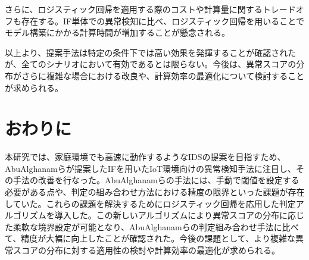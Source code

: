 \documentclass{css}
\begin{document}
さらに、ロジスティック回帰を適用する際のコストや計算量に関するトレードオフも存在する。IF単体での異常検知に比べ、ロジスティック回帰を用いることでモデル構築にかかる計算時間が増加することが懸念される。

以上より、提案手法は特定の条件下では高い効果を発揮することが確認されたが、全てのシナリオにおいて有効であるとは限らない。今後は、異常スコアの分布がさらに複雑な場合における改良や、計算効率の最適化について検討することが求められる。

\section{おわりに}
本研究では、家庭環境でも高速に動作するようなIDSの提案を目指すため、AbuAlghanamらが提案したIFを用いたIoT環境向けの異常検知手法\cite{AbuAlghanam2023-sx}に注目し、その手法の改善を行なった。AbuAlghanamらの手法には、手動で閾値を設定する必要がある点や、判定の組み合わせ方法における精度の限界といった課題が存在していた。これらの課題を解決するためにロジスティック回帰を応用した判定アルゴリズムを導入した。この新しいアルゴリズムにより異常スコアの分布に応じた柔軟な境界設定が可能となり、AbuAlghanamらの判定組み合わせ手法に比べて、精度が大幅に向上したことが確認された。今後の課題として、より複雑な異常スコアの分布に対する適用性の検討や計算効率の最適化が求められる。


\end{document}
